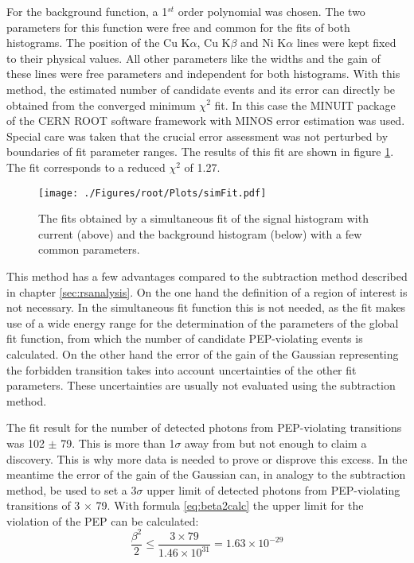 For the background function, a 1$^{st}$ order polynomial was chosen. The two parameters for this function were free and common for the fits of both histograms. The position of the Cu K$\alpha$, Cu K$\beta$ and Ni K$\alpha$ lines were kept fixed to their physical values. All other parameters like the widths and the gain of these lines were free parameters and independent for both histograms. With this method, the estimated number of candidate events and its error can directly be obtained from the converged minimum $\chi^{2}$ fit. In this case the MINUIT package of the CERN ROOT software framework with MINOS error estimation was used. Special care was taken that the crucial error assessment was not perturbed by boundaries of fit parameter ranges. The results of this fit are shown in figure \ref{fig:simFit}. The fit corresponds to a reduced $\chi^{2}$ of 1.27.
\begin{figure}[h]
 \centering
 \texttt{[image: ./Figures/root/Plots/simFit.pdf]}
 \caption{The fits obtained by a simultaneous fit of the signal histogram with current (above) and the background histogram (below) with a few common parameters.}
 \label{fig:simFit}
\end{figure}

This method has a few advantages compared to the subtraction method described in chapter \ref{sec:rsanalysis}. On the one hand the definition of a region of interest is not necessary. In the simultaneous fit function this is not needed, as the fit makes use of a wide energy range for the determination of the parameters of the global fit function, from which the number of candidate PEP-violating events is calculated. On the other hand the error of the gain of the Gaussian representing the forbidden transition takes into account uncertainties of the other fit parameters. These uncertainties are usually not evaluated using the subtraction method. 

The fit result for the number of detected photons from PEP-violating transitions was 102 $\pm$ 79. This is more than 1$\sigma$ away from but not enough to claim a discovery. This is why more data is needed to prove or disprove this excess. In the meantime the error of the gain of the Gaussian can, in analogy to the subtraction method, be used to set a 3$\sigma$ upper limit of detected photons from PEP-violating transitions of 3 $\times$ 79. With formula \ref{eq:beta2calc} the upper limit for the violation of the PEP can be calculated:
\begin{equation}
 \frac{\beta^{2}}{2} \leq \frac{3 \times 79}{1.46 \times 10^{31}} = 1.63 \times 10^{-29}
\end{equation} 

